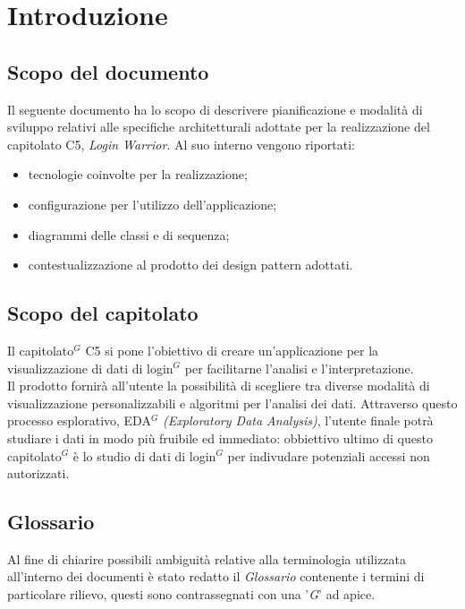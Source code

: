 \section{Introduzione}
\subsection{Scopo del documento}
Il seguente documento ha lo scopo di descrivere pianificazione e modalità di sviluppo relativi alle specifiche architetturali adottate per la realizzazione del capitolato C5, \textit{Login Warrior}.
Al suo interno vengono riportati:
\begin{itemize}
    \item tecnologie coinvolte per la realizzazione;
    \item configurazione per l'utilizzo dell'applicazione;
    \item diagrammi delle classi e di sequenza;
    \item contestualizzazione al prodotto dei design pattern adottati.
\end{itemize}

\subsection{Scopo del capitolato}
Il capitolato$^G$  C5 si pone l'obiettivo di creare un'applicazione per la visualizzazione di dati di login$^G$
per facilitarne l'analisi e l'interpretazione.\\
Il prodotto fornirà all'utente la possibilità di scegliere tra diverse
modalità di visualizzazione personalizzabili e algoritmi per l'analisi dei dati.
Attraverso questo processo esplorativo, EDA$^G$  \textit{(Exploratory Data Analysis)},
l'utente finale potrà studiare i dati in modo più fruibile ed immediato: obbiettivo ultimo
di questo capitolato$^G$  è lo studio di dati di login$^G$  per indivudare potenziali accessi non autorizzati.

\subsection{Glossario}
Al fine di chiarire possibili ambiguità relative alla terminologia utilizzata all'interno dei documenti è stato redatto il \textit{Glossario} contenente i termini di particolare rilievo,
questi sono contrassegnati con una '\textit{G}' ad apice.